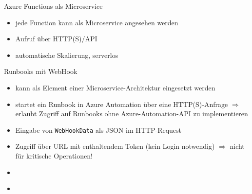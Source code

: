 \begin{flashcard}[]{Azure Functions als Microservice}
  \begin{itemize}
    \item jede Function kann als Microservice angesehen werden
    \item Aufruf über HTTP(S)/API
    \item automatische Skalierung, serverlos
  \end{itemize}
\end{flashcard}

\begin{flashcard}[]{Runbooks mit WebHook}
  \begin{itemize}
    \item kann als Element einer Microservice-Architektur eingesetzt werden
    \item startet ein Runbook in Azure Automation über eine HTTP(S)-Anfrage
      $\Rightarrow$ erlaubt Zugriff auf Runbooks ohne Azure-Automation-API zu implementieren
    \item Eingabe von \texttt{WebHookData} als JSON im HTTP-Request
    \item Zugriff über URL mit enthaltendem Token (kein Login notwendig)\newline
      $\Rightarrow$ nicht für kritische Operationen!
  \end{itemize}
\end{flashcard}


\begin{flashcard}[]{}
  \begin{itemize}
    \item
  \end{itemize}
\end{flashcard}

\begin{flashcard}[]{}
  \begin{itemize}
    \item
  \end{itemize}
\end{flashcard}

